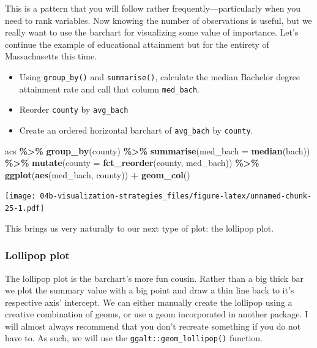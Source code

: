 \documentclass[
]{book}
\newenvironment{Shaded}{\begin{snugshade}}{\end{snugshade}}
\newcommand{\DataTypeTok}[1]{\textcolor[rgb]{0.13,0.29,0.53}{#1}}
\newcommand{\KeywordTok}[1]{\textcolor[rgb]{0.13,0.29,0.53}{\textbf{#1}}}
\newcommand{\NormalTok}[1]{#1}
\newcommand{\OperatorTok}[1]{\textcolor[rgb]{0.81,0.36,0.00}{\textbf{#1}}}
\newcommand{\StringTok}[1]{\textcolor[rgb]{0.31,0.60,0.02}{#1}}
\providecommand{\tightlist}{%
  \setlength{\itemsep}{0pt}\setlength{\parskip}{0pt}}
\begin{document}
This is a pattern that you will follow rather frequently---particularly when you need to rank variables. Now knowing the number of observations is useful, but we really want to use the barchart for visualizing some value of importance. Let's continue the example of educational attainment but for the entirety of Massachusetts this time.

\begin{itemize}
\tightlist
\item
  Using \texttt{group\_by()} and \texttt{summarise()}, calculate the median Bachelor degree attainment rate and call that column \texttt{med\_bach}.
\item
  Reorder \texttt{county} by \texttt{avg\_bach}
\item
  Create an ordered horizontal barchart of \texttt{avg\_bach} by \texttt{county}.
\end{itemize}

\begin{Shaded}
\begin{Highlighting}[]
\NormalTok{acs }\OperatorTok{\%\textgreater{}\%}\StringTok{ }
\StringTok{  }\KeywordTok{group\_by}\NormalTok{(county) }\OperatorTok{\%\textgreater{}\%}\StringTok{ }
\StringTok{  }\KeywordTok{summarise}\NormalTok{(}\DataTypeTok{med\_bach =} \KeywordTok{median}\NormalTok{(bach)) }\OperatorTok{\%\textgreater{}\%}\StringTok{ }
\StringTok{  }\KeywordTok{mutate}\NormalTok{(}\DataTypeTok{county =} \KeywordTok{fct\_reorder}\NormalTok{(county, med\_bach)) }\OperatorTok{\%\textgreater{}\%}\StringTok{ }
\StringTok{  }\KeywordTok{ggplot}\NormalTok{(}\KeywordTok{aes}\NormalTok{(med\_bach, county)) }\OperatorTok{+}\StringTok{ }
\StringTok{  }\KeywordTok{geom\_col}\NormalTok{()}
\end{Highlighting}
\end{Shaded}

\texttt{[image: 04b-visualization-strategies\_files/figure-latex/unnamed-chunk-25-1.pdf]}

This brings us very naturally to our next type of plot: the lollipop plot.

\hypertarget{lollipop-plot}{%
\subsubsection{Lollipop plot}\label{lollipop-plot}}

The lollipop plot is the barchart's more fun cousin. Rather than a big thick bar we plot the summary value with a big point and draw a thin line back to it's respective axis' intercept. We can either manually create the lollipop using a creative combination of geoms, or use a geom incorporated in another package. I will almost always recommend that you don't recreate something if you do not have to. As such, we will use the \texttt{ggalt::geom\_lollipop()} function.
\end{document}
